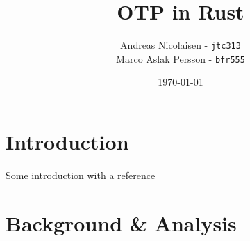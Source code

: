 \documentclass[a4paper]{article}
\title{OTP in Rust}
\author{Andreas Nicolaisen - \texttt{jtc313} \\ Marco Aslak Persson - \texttt{bfr555}}
\date{\today}
\begin{document}

\maketitle

\section{Introduction}
Some introduction with a reference\cite{SuturePost}

\section{Background \& Analysis}




\end{document}
